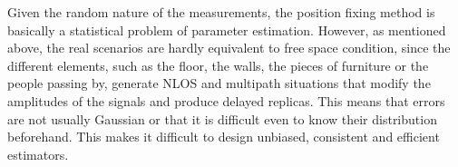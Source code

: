 
Given the random nature of the measurements, the position fixing method is basically a statistical problem of parameter estimation.
However, as mentioned above, the real scenarios are hardly equivalent to free space condition, since the different elements, such as the floor, the walls, the pieces of furniture or the people passing by, generate NLOS and multipath situations that modify the amplitudes of the signals and produce delayed replicas. 
This means that errors are not usually Gaussian or that it is difficult even to know their distribution beforehand.
This makes it difficult to design unbiased, consistent and efficient estimators.


